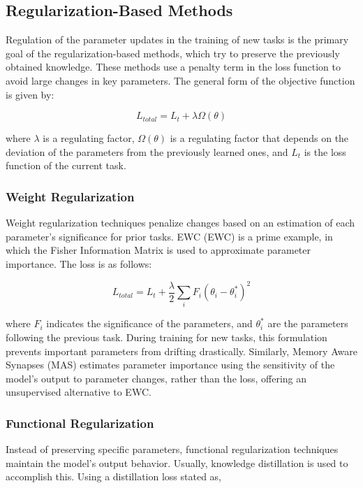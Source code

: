 \documentclass[english, LaM, oneside]{sapthesis}%
\numberwithin{equation}{chapter}
\begin{document}
\subsection{Regularization-Based Methods}
Regulation of the parameter updates in the training of new tasks is the primary goal of the regularization-based methods, which try to preserve the previously obtained knowledge\cite{2}. These methods use a penalty term in the loss function to avoid large changes in key parameters. The general form of the objective function is given by:

\begin{equation}
    L_{total}=L_t+\lambda\Omega\left(\theta\right)
\end{equation}

where $\lambda$ is a regulating factor, $\Omega\left(\theta\right)$ is a regulating factor that depends on the deviation of the parameters from the previously learned ones, and $L_t$ is the loss function of the current task.

\subsubsection{Weight Regularization}
Weight regularization techniques penalize changes based on an estimation of each parameter's significance for prior tasks. EWC (EWC)\cite{2} is a prime example, in which the Fisher Information Matrix is used to approximate parameter importance. The loss is as follows: 

\begin{equation}
    L_{total}=L_t+\frac{\lambda}{2}\sum_{i}{F_i\left(\theta_i-\theta_i^\ast\right)^2}
\end{equation}

where $F_i$ indicates the significance of the parameters, and $\theta_i^\ast$ are the parameters following the previous task. During training for new tasks, this formulation prevents important parameters from drifting drastically. Similarly, Memory Aware Synapses (MAS) \cite{7} estimates parameter importance using the sensitivity of the model's output to parameter changes, rather than the loss, offering an unsupervised alternative to EWC.

\subsubsection{Functional Regularization}
Instead of preserving specific parameters, functional regularization techniques maintain the model's output behavior. Usually, knowledge distillation\cite{8} is used to accomplish this. Using a distillation loss stated as, 
\end{document}

